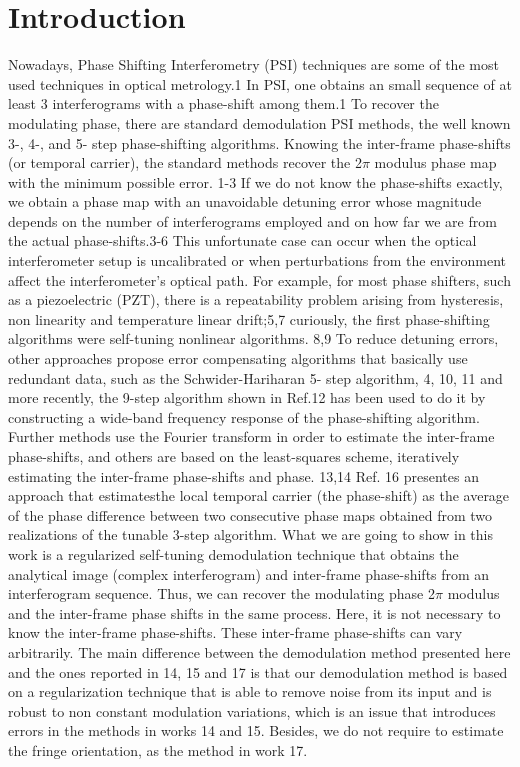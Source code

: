 \documentclass[letterpaper,12pt]{article}   %
\begin{document}
\section{Introduction}
Nowadays, Phase Shifting Interferometry (PSI) techniques are some of the most used techniques in optical metrology.1 In PSI, one obtains an small sequence of at least 3 interferograms with a phase-shift among them.1 To recover the modulating phase, there are standard demodulation PSI methods, the well known 3-, 4-, and 5- step phase-shifting algorithms. Knowing the inter-frame phase-shifts (or temporal carrier), the standard methods recover the 2$\pi$ modulus phase map with the minimum possible error. 1-3 If we do not know the phase-shifts exactly, we obtain a phase map with an unavoidable detuning error whose magnitude depends on the number of interferograms employed and on how far we are from the actual phase-shifts.3-6 This unfortunate case can occur when the optical interferometer setup is uncalibrated or when perturbations from the environment affect the interferometer's optical path. For example, for most phase shifters, such as a piezoelectric (PZT), there is a repeatability problem arising from hysteresis, non linearity and temperature linear drift;5,7 curiously, the first phase-shifting algorithms were self-tuning nonlinear algorithms. 8,9 To reduce detuning errors, other approaches propose error compensating algorithms that basically use redundant data, such as the Schwider-Hariharan 5- step algorithm, 4, 10, 11 and more recently, the 9-step algorithm shown in Ref.12 has been used to do it by constructing a wide-band frequency response of the phase-shifting algorithm. Further methods use the Fourier transform in order to estimate the inter-frame phase-shifts, and others are based on the least-squares scheme, iteratively estimating the inter-frame phase-shifts and phase. 13,14 Ref. 16 presentes an approach that estimatesthe local temporal carrier (the phase-shift) as the average of the phase difference between two consecutive phase maps obtained from two realizations of the tunable 3-step algorithm. What we are going to show in this work is a regularized self-tuning demodulation technique that obtains the analytical image (complex interferogram) and inter-frame phase-shifts from an interferogram sequence. Thus, we can recover the modulating phase 2$\pi$ modulus and the inter-frame phase shifts in the same process. Here, it is not necessary to know the inter-frame phase-shifts. These inter-frame phase-shifts can vary arbitrarily. The main difference between the demodulation method presented here and the ones reported in 14, 15 and 17 is that our demodulation method is based on a regularization technique that is able to remove noise from its input and is robust to non constant modulation variations, which is an issue that introduces errors in the methods in works 14 and 15. Besides, we do not require to estimate the fringe orientation, as the method in work 17.
\cite{a6,a1_OpticalTesting,a3,a2,a7}
\end{document}
